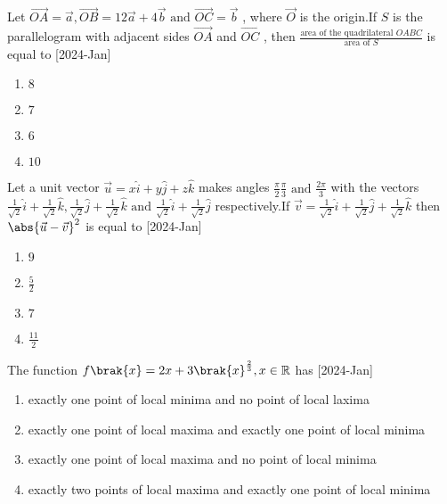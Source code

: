 \iffalse
    \title{2024}
    \author{EE24BTECH11011}
    \section{mcq-single}
\fi 
\item Let $\vec{OA} = \vec{a} , \vec{OB} = 12\vec{a} + 4\vec{b} \text{ and } \vec{OC} = \vec{b}$ , where $\vec{O}$ is the origin.If $S$ is the parallelogram with adjacent sides $\vec{OA}$ and $\vec{OC}$ , then $\frac{\text{area of the quadrilateral }OABC}{\text{area of }S}$ is equal to \hfill[2024-Jan]
\begin{multicols}{2}
\begin{enumerate}
\item $8$
\item $7$
\item $6$
\item $10$
\end{enumerate}
\end{multicols}
\item Let a unit vector $\vec{u} = x\hat{i}+y\hat{j}+z\hat{k}$ makes angles $\frac{\pi}{2} \frac{\pi}{3} \text{ and } \frac{2\pi}{3}$ with the vectors $\frac{1}{\sqrt{2}}\hat{i}+\frac{1}{\sqrt{2}}\hat{k} , \frac{1}{\sqrt{2}}\hat{j}+\frac{1}{\sqrt{2}}\hat{k} \text{ and } \frac{1}{\sqrt{2}}\hat{i}+\frac{1}{\sqrt{2}}\hat{j}$ respectively.If $\vec{v} = \frac{1}{\sqrt{2}}\hat{i}+\frac{1}{\sqrt{2}}\hat{j}+\frac{1}{\sqrt{2}}\hat{k}$ then $\abs{\vec{u} - \vec{v}}^2 $ is equal to \hfill[2024-Jan]
\begin{multicols}{2}
\begin{enumerate}
\item $9$\\
\item $\frac{5}{2}$
\item $7$\\
\item $\frac{11}{2}$
\end{enumerate}
\end{multicols}
\item The function $f\brak{x} = 2x + 3\brak{x}^{\frac{2}{3}} , x \in \mathbb{R} $ has \hfill[2024-Jan]
	\begin{enumerate}
		\item exactly one point of local minima and no point of local laxima
		\item exactly one point of local maxima and exactly one point of local minima
		\item exactly one point of local maxima and no point of local minima
		\item exactly two points of local maxima and exactly one point of local minima\\
	\end{enumerate}
